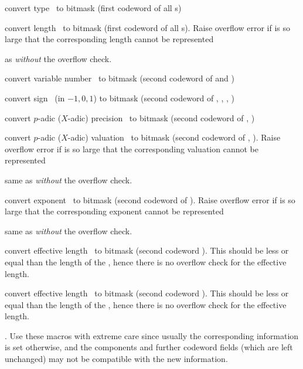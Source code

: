  convert type~ to bitmask (first
codeword of all s)

 convert length~ to bitmask (first
codeword of all s). Raise overflow error if  is so large that
the corresponding length cannot be represented

 as  \emph{without} the overflow
check.

 convert variable number~ to bitmask
(second codeword of  and )

 convert sign~ (in $-1,0,1$) to bitmask
(second codeword of , , , )

 convert $p$-adic ($X$-adic) precision~
to bitmask (second codeword of , )

 convert $p$-adic ($X$-adic) valuation~ to
bitmask (second codeword of , ). Raise overflow error if
 is so large that the corresponding valuation cannot be represented

 same as  \emph{without} the
overflow check.

 convert exponent~ to bitmask (second
codeword of ). Raise overflow error if  is so
large that the corresponding exponent cannot be represented

 same as  \emph{without} the
overflow check.

 convert effective length~ to bitmask
(second codeword ). This should be less or equal than the length
of the , hence there is no overflow check for the effective length.

 convert effective length~ to bitmask
(second codeword ). This should be less or equal than the length of
the , hence there is no overflow check for the effective length.

.
Use these macros with extreme care since usually the corresponding
information is set otherwise, and the components and further codeword fields
(which are left unchanged) may not be compatible with the new information.


